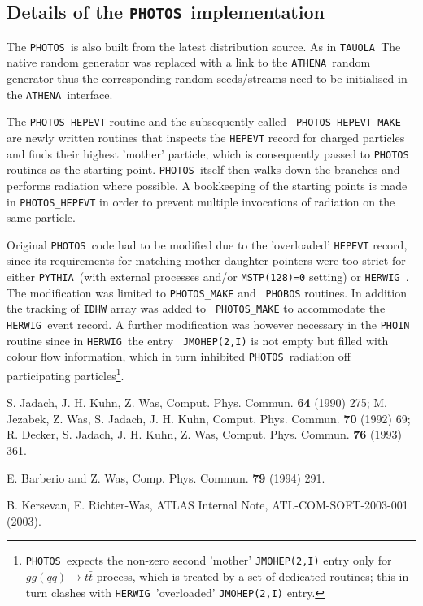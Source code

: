 \documentclass[a4paper,12pt]{article}
\newcommand{\athena}{{\tt ATHENA }}
\newcommand{\pythia}{{\tt PYTHIA }}
\newcommand{\herwig}{{\tt HERWIG }}
\newcommand{\tauola}{{\tt TAUOLA }}
\newcommand{\photos}{{\tt PHOTOS }}
\begin{document}
\boldmath 
\subsection{Details of the \photos implementation}
\unboldmath

The \photos is also built from the latest distribution source. As in \tauola The
native random generator was replaced with a link to the
\athena random generator thus the corresponding random seeds/streams need to be
initialised in the \athena interface.

The {\tt PHOTOS\_HEPEVT} routine and the subsequently called {\tt
PHOTOS\_HEPEVT\_MAKE} are newly written routines that inspects the {\tt HEPEVT}
record for charged particles and finds their highest 'mother' particle, which is
consequently passed to \photos routines as the starting point. \photos itself then
walks down the branches and performs radiation where possible. A bookkeeping of
the starting points is made in {\tt PHOTOS\_HEPEVT} in order to prevent multiple
invocations of radiation on the same particle.

Original \photos code had to be modified due to the 'overloaded' {\tt HEPEVT}
record, since its requirements for matching mother-daughter pointers were too
strict for either \pythia (with external processes and/or {\tt MSTP(128)=0}
setting) or \herwig. The modification was limited to {\tt PHOTOS\_MAKE} and {\tt
PHOBOS} routines. In addition the tracking of {\tt IDHW} array was added to {\tt
PHOTOS\_MAKE} to accommodate the \herwig event record. A further modification was
however necessary in the {\tt PHOIN} routine since in \herwig the entry {\tt
JMOHEP(2,I)} is not empty but filled with colour flow information, which in turn
inhibited \photos radiation off participating particles\footnote{\photos expects
the non-zero second 'mother' {\tt JMOHEP(2,I)} entry only for $gg(qq) \to
t\bar{t}$ process, which is treated by a set of dedicated routines; this in turn
clashes with \herwig 'overloaded' {\tt JMOHEP(2,I)} entry.}. 

\begin{thebibliography}{99}


S. Jadach, J. H. Kuhn, Z. Was, Comput. Phys. Commun. {\bf 64} (1990) 275;
M. Jezabek, Z. Was, S. Jadach, J. H. Kuhn, Comput. Phys. Commun. {\bf 70}
(1992) 69; R. Decker, S. Jadach, J. H. Kuhn, Z. Was, Comput. Phys. Commun. {\bf 76} 
(1993) 361.  

E. Barberio and Z. Was, Comp. Phys. Commun. {\bf 79} (1994) 291.

B. Kersevan, E. Richter-Was, ATLAS Internal Note, ATL-COM-SOFT-2003-001 (2003).

\end{thebibliography}
\end{document}

